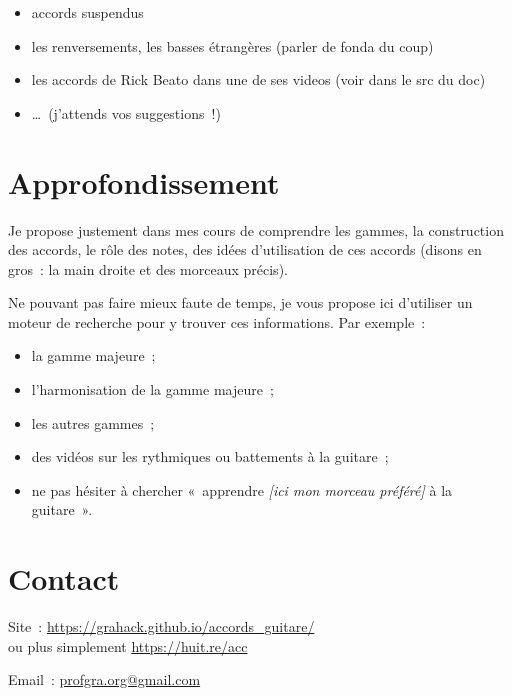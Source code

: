 \documentclass[11pt]{article}
\begin{document}
\begin{itemize}
\item accords suspendus
\item les renversements, les basses étrangères (parler de fonda du coup)
\item les accords de Rick Beato dans une de ses videos (voir dans le src du doc)
\item \ldots~(j’attends vos suggestions~!)
\end{itemize}

\section{Approfondissement} \label{approf}

Je propose justement dans mes cours de comprendre les gammes, la construction
des accords, le rôle des notes, des idées d’utilisation de ces accords (disons
en gros~: la main droite et des morceaux précis).

Ne pouvant pas faire mieux faute de temps, je vous propose ici d’utiliser un
moteur de recherche pour y trouver ces informations. Par exemple~:

\begin{itemize}
\item la gamme majeure~;
\item l’harmonisation de la gamme majeure~;
\item les autres gammes~;
\item des vidéos sur les rythmiques ou battements à la guitare~;
\item ne pas hésiter à chercher «~apprendre \textit{[ici mon morceau préféré]}
       à la guitare~».
\end{itemize}

\section{Contact} \label{contact}

\setlength{\parindent}{0pt}

Site~: \url{https://grahack.github.io/accords_guitare/} \\
ou plus simplement \url{https://huit.re/acc}

Email~: \url{profgra.org@gmail.com}
\end{document}
